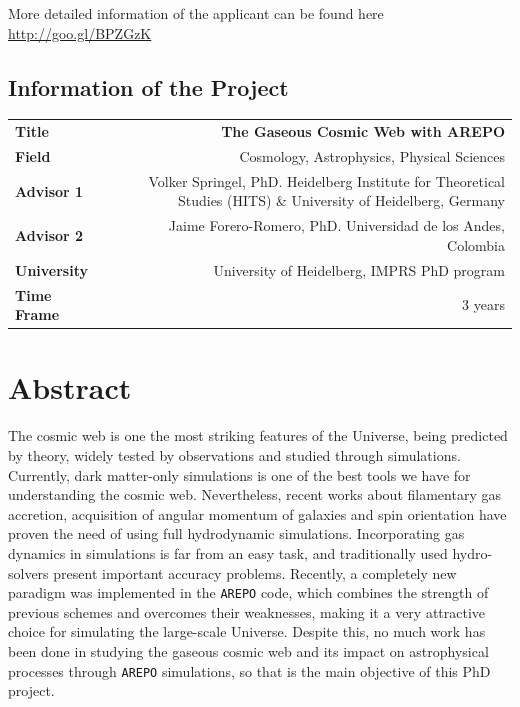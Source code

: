 \documentclass[a4,useAMS,usenatbib,usegraphicx,12pt]{article}
\begin{document}
\vspace{10pt}

More detailed information of the applicant can be found here \url{http://goo.gl/BPZGzK}

\vspace{15pt}  

\subsection*{Information of the Project}
\begin{tabular}{L!{\VRule}R}
\bf Title		& \bf The Gaseous Cosmic Web with AREPO\\
\bf Field		& Cosmology, Astrophysics, Physical Sciences \\
\bf Advisor 1	& Volker Springel, PhD. Heidelberg Institute for Theoretical Studies (HITS) \& University of Heidelberg, Germany \\
\bf Advisor 2	& Jaime Forero-Romero, PhD. Universidad de los Andes, Colombia \\
\bf University	& University of Heidelberg, IMPRS PhD program \\
\bf Time Frame	& 3 years \\
\end{tabular}
\normalsize


\section{Abstract}


The cosmic web is one the most striking features of the Universe, being predicted
by theory, widely tested by observations and studied through simulations. 
Currently, dark matter-only simulations is one of the best tools we have for 
understanding the cosmic web. Nevertheless, recent works about filamentary gas 
accretion, acquisition of angular momentum of galaxies and spin orientation have
proven the need of using full hydrodynamic simulations. Incorporating gas dynamics
in simulations is far from an easy task, and traditionally used hydro-solvers
present important accuracy problems. Recently, a completely new paradigm was 
implemented in the \texttt{AREPO} code, which combines the strength of previous
schemes and overcomes their weaknesses, making it a very attractive choice for 
simulating the large-scale Universe. Despite this, no much work has been done in 
studying the gaseous cosmic web and its impact on astrophysical processes through
\texttt{AREPO} simulations, so that is the main objective of this PhD project.
\end{document}
